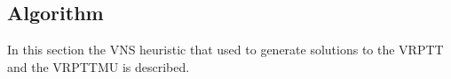 \subsection{Algorithm  }

\label{sec:algo}

In this section the VNS heuristic that used to generate solutions to the VRPTT and the VRPTTMU is described.\\









